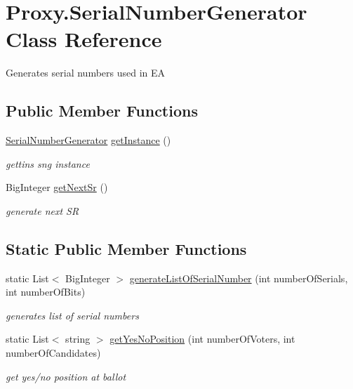 \hypertarget{class_proxy_1_1_serial_number_generator}{}\section{Proxy.\+Serial\+Number\+Generator Class Reference}
\label{class_proxy_1_1_serial_number_generator}


Generates serial numbers used in E\+A  


\subsection*{Public Member Functions}
\begin{DoxyCompactItemize}
\item 
\hyperlink{class_proxy_1_1_serial_number_generator}{Serial\+Number\+Generator} \hyperlink{class_proxy_1_1_serial_number_generator_aad974711599d7e7fa0eff9964afc1f9d}{get\+Instance} ()
\begin{DoxyCompactList}\small\item\em gettins sng instance \end{DoxyCompactList}\item 
Big\+Integer \hyperlink{class_proxy_1_1_serial_number_generator_afb9d709e3d7d4c9c1fb1586e032fe74f}{get\+Next\+Sr} ()
\begin{DoxyCompactList}\small\item\em generate next S\+R \end{DoxyCompactList}\end{DoxyCompactItemize}
\subsection*{Static Public Member Functions}
\begin{DoxyCompactItemize}
\item 
static List$<$ Big\+Integer $>$ \hyperlink{class_proxy_1_1_serial_number_generator_a95bbd56dea7f1eaf1ea4fabdf60184da}{generate\+List\+Of\+Serial\+Number} (int number\+Of\+Serials, int number\+Of\+Bits)
\begin{DoxyCompactList}\small\item\em generates list of serial numbers \end{DoxyCompactList}\item 
static List$<$ string $>$ \hyperlink{class_proxy_1_1_serial_number_generator_a4e8217de0a61e1242bf1f50627e98d8b}{get\+Yes\+No\+Position} (int number\+Of\+Voters, int number\+Of\+Candidates)
\begin{DoxyCompactList}\small\item\em get yes/no position at ballot \end{DoxyCompactList}\end{DoxyCompactItemize}


